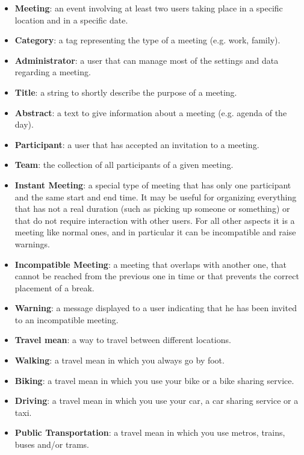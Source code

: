 \begin{itemize}
\item \textbf{Meeting}: an event involving at least two users taking place in a specific location and in a specific date.
\item \textbf{Category}: a tag representing the type of a meeting (e.g. work, family).
\item \textbf{Administrator}: a user that can manage most of the settings and data regarding a meeting.
\item \textbf{Title}: a string to shortly describe the purpose of a meeting.
\item \textbf{Abstract}: a text to give information about a meeting (e.g. agenda of the day).
\item \textbf{Participant}: a user that has accepted an invitation to a meeting.
\item \textbf{Team}: the collection of all participants of a given meeting.
\item \textbf{Instant Meeting}: a special type of meeting that has only one participant and the same start and end time. It may be useful for organizing everything that has not a real duration (such as picking up someone or something) or that do not require interaction with other users. For all other aspects it is a meeting like normal ones, and in particular it can be incompatible and raise warnings.

\item \textbf{Incompatible Meeting}: a meeting that overlaps with another one, that cannot be reached from the previous one in time or that prevents the correct placement of a break.
\item \textbf{Warning}: a message displayed to a user indicating that he has been invited to an incompatible meeting.

\item \textbf{Travel mean}: a way to travel between different locations.
\item \textbf{Walking}: a travel mean in which you always go by foot.
\item \textbf{Biking}: a travel mean in which you use your bike or a bike sharing service.
\item \textbf{Driving}: a travel mean in which you use your car, a car sharing service or a taxi.
\item \textbf{Public Transportation}: a travel mean in which you use metros, trains, buses and/or trams.


\end{itemize}
